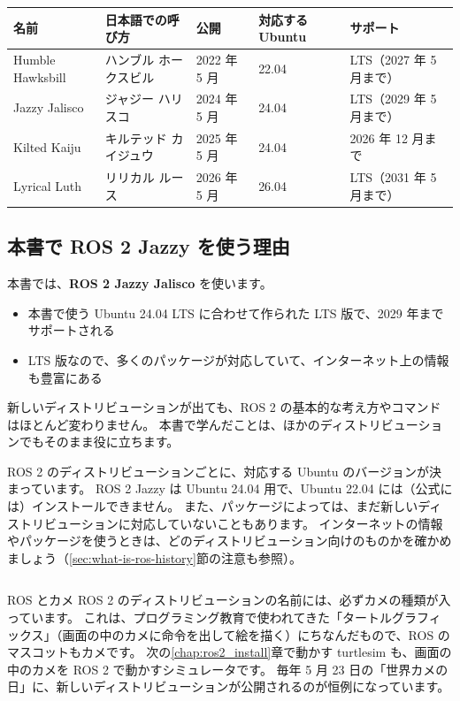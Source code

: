 \begin{tablebox}
  \begin{tabular}{lllll}
    \toprule
    名前 & 日本語での呼び方 & 公開 & 対応する Ubuntu & サポート \\
    \midrule
    Humble Hawksbill & ハンブル ホークスビル & 2022 年 5 月 & 22.04 & LTS（2027 年 5 月まで） \\
    Jazzy Jalisco & ジャジー ハリスコ & 2024 年 5 月 & 24.04 & LTS（2029 年 5 月まで） \\
    Kilted Kaiju & キルテッド カイジュウ & 2025 年 5 月 & 24.04 & 2026 年 12 月まで \\
    Lyrical Luth & リリカル ルース & 2026 年 5 月 & 26.04 & LTS（2031 年 5 月まで） \\
    \bottomrule
  \end{tabular}
\end{tablebox}

\subsection{本書で ROS 2 Jazzy を使う理由}

本書では、\textbf{ROS 2 Jazzy Jalisco} を使います。

\begin{itemize}
  \item 本書で使う Ubuntu 24.04 LTS に合わせて作られた LTS 版で、2029 年までサポートされる
  \item LTS 版なので、多くのパッケージが対応していて、インターネット上の情報も豊富にある
\end{itemize}

新しいディストリビューションが出ても、ROS 2 の基本的な考え方やコマンドはほとんど変わりません。
本書で学んだことは、ほかのディストリビューションでもそのまま役に立ちます。

\begin{caution}
  ROS 2 のディストリビューションごとに、対応する Ubuntu のバージョンが決まっています。
  ROS 2 Jazzy は Ubuntu 24.04 用で、Ubuntu 22.04 には（公式には）インストールできません。
  また、パッケージによっては、まだ新しいディストリビューションに対応していないこともあります。
  インターネットの情報やパッケージを使うときは、どのディストリビューション向けのものかを確かめましょう（\ref{sec:what-is-ros-history}節の注意も参照）。
\end{caution}

\begin{column}{ROS とカメ}
  ROS 2 のディストリビューションの名前には、必ずカメの種類が入っています。
  これは、プログラミング教育で使われてきた「タートルグラフィックス」（画面の中のカメに命令を出して絵を描く）にちなんだもので、ROS のマスコットもカメです。
  次の\ref{chap:ros2_install}章で動かす turtlesim も、画面の中のカメを ROS 2 で動かすシミュレータです。
  毎年 5 月 23 日の「世界カメの日」に、新しいディストリビューションが公開されるのが恒例になっています。
\end{column}

